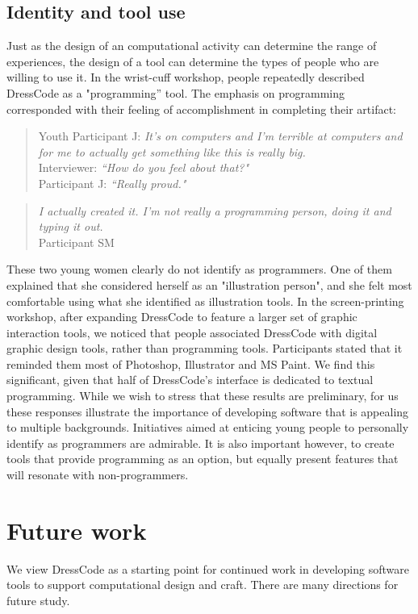 \documentclass{sigchi}
\begin{document}
\subsection{Identity and tool use}
Just as the design of an computational activity can determine the range of experiences, the design of a tool can determine the types of people who are willing to use it. In the wrist-cuff workshop, people repeatedly described DressCode as a "programming'' tool. The emphasis on programming corresponded with their feeling of accomplishment in completing their artifact:
 \begin{quote}
Youth Participant J: \textit{It's on computers and I'm terrible at computers and for me to actually get something like this is really big.} 
\\Interviewer: \textit{``How do you feel about that?"}
\\Participant J: \textit{``Really proud."} 
\end{quote}

 \begin{quote}
 \textit{I actually created it. I'm not really a programming person, doing it and typing it out.}
 \\Participant SM
 \end{quote}

These two young women clearly do not identify as programmers. One of them explained that she considered herself as an "illustration person", and she felt most comfortable using what she identified as illustration tools. In the screen-printing workshop, after expanding DressCode to feature a larger set of graphic interaction tools, we noticed that people associated DressCode with digital graphic design tools, rather than programming tools. Participants stated that it reminded them most of Photoshop, Illustrator and MS Paint. We find this significant, given that half of DressCode's interface is dedicated to textual programming. While we wish to stress that these results are preliminary, for us these responses illustrate the importance of developing software that is appealing to multiple backgrounds. Initiatives aimed at enticing young people to personally identify as programmers are admirable. It is also important however, to create tools that provide programming as an option, but equally present features that will resonate with non-programmers.

\section{Future work}
We view DressCode as a starting point for continued work in developing software tools to support computational design and craft. There are many directions for future study. 
\end{document}
